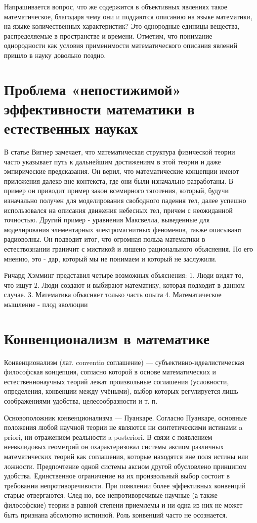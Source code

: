 \documentclass[12pt, specialist, subf, substylefile = spbu.rtx]{disser}
\begin{document}
Напрашивается вопрос, что же содержится в объективных явлениях такое математическое, благодаря чему они и поддаются описанию на языке математики, на языке количественных характеристик? Это однородные единицы вещества, распределяемые в пространстве и времени.  Отметим, что понимание однородности как условия применимости математического описания явлений пришло в науку довольно поздно. 

\section{Проблема «непостижимой» эффективности математики в естественных науках}
В статье Вигнер замечает, что математическая структура физической теории часто указывает путь к дальнейшим достижениям в этой теории и даже эмпирические предсказания.
Он верил, что математические концепции имеют приложения далеко вне контекста, где они были изначально разработаны. В пример он приводит пример закон всемирного тяготения, который, будучи изначально получен для моделирования свободного падения тел, далее успешно использовался на описания движения небесных тел, причем с неожиданной точностью. 
Другий пример - уравнения Максвелла, выведенные для моделирования элементарных электромагнитных феноменов, также описывают радиоволны. Он подводит итог, что огромная польза математики в естествознании граничит с мистикой и лишено рационального объяснения. По его мнению, это - дар, который мы не понимаем и который не заслужили.

Ричард Хэмминг представил четыре возможных объяснения:
1. Люди видят то, что ищут
2. Люди создают и выбирают математику, которая подходит в данном случае.
3. Математика объясняет только часть опыта
4. Математическое мышление - плод эволюции

\section{Конвенционализм в математике}
Конвенционализм (лат. conventio соглашение) — субъективно-идеалистическая философская концепция, согласно которой в основе математических и естественнонаучных теорий лежат произвольные соглашения (условности, определения, конвенции между учёными), выбор которых регулируется лишь соображениями удобства, целесообразности и т. п.

Основоположник конвенционализма — Пуанкаре.
Согласно Пуанкаре, основные положения любой научной теории не являются ни синтетическими истинами a priori, ни отражением реальности a posteriori. В связи с появлением неевклидовых геометрий он охарактеризовал системы аксиом различных математических теорий как соглашения, которые находятся вне поля истины или ложности. Предпочтение одной системы аксиом другой обусловлено принципом удобства. Единственное ограничение на их произвольный выбор состоит в требовании непротиворечивости.
При появлении более эффективных конвенций старые отвергаются.
След-но, все непротиворечивые научные (а также философские) теории в равной степени приемлемы и ни одна из них не может быть признана абсолютно истинной. Роль конвенций часто не осознается.
\end{document}
